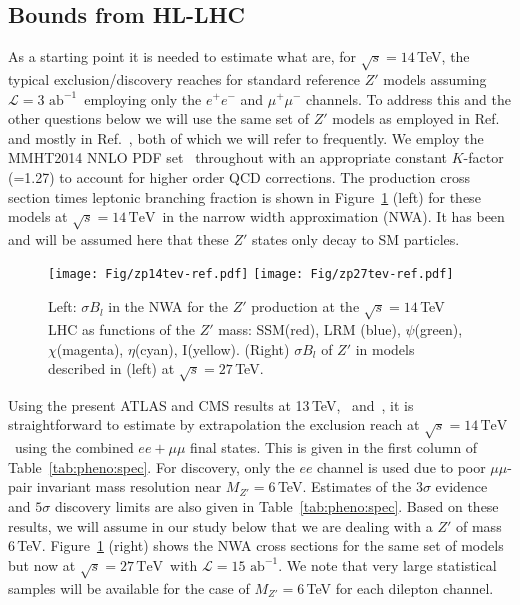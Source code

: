 \documentclass[a4paper,11pt]{article}
\newcommand*{\intlumihelhc}{\ensuremath{\mathcal{L}=15\,\text{ab}^{-1}}}
\newcommand*{\sqrtslhc}{\ensuremath{\sqrt{s}=14\,\text{TeV}}}
\newcommand*{\sqrtshelhc}{\ensuremath{\sqrt{s}=27\,\text{TeV}}}
\renewcommand*{\intlumihelhc}{\ensuremath{\mathcal{L}=15\text{ ab}^{-1}}}
\newcommand*{\intlumihllhc}{\ensuremath{\mathcal{L}=3\text{ ab}^{-1}}}
\begin{document}
\subsection{Bounds from HL-LHC}
As a starting point it is needed to estimate what are, for $\sqrt s=14$\,TeV, the typical exclusion/discovery reaches for standard reference $Z'$ models assuming \intlumihllhc\ employing only the $e^+e^-$ and $\mu^+\mu^-$ channels. To address this and the other questions below we will use the same set of $Z'$ models as employed
in Ref.~\cite{Rizzo:2014xma} and mostly in Ref.~\cite{Han:2013mra}, both of which we will refer to frequently. We employ the MMHT2014 NNLO PDF set~\cite{Harland-Lang:2014zoa}
throughout with an appropriate constant $K$-factor (=1.27) to account for higher order QCD corrections. The production cross section times leptonic branching fraction is shown in Figure~\ref{fig:pheno:toy} (left) for these models at \sqrtslhc\ in the narrow width approximation (NWA). It has been and will be assumed here that these $Z'$ states only decay to SM particles.


\begin{figure}[htbp]
  \centering
    \texttt{[image: Fig/zp14tev-ref.pdf]}
    \texttt{[image: Fig/zp27tev-ref.pdf]}
    \caption{Left: $\sigma B_l$ in the NWA for the $Z'$ production at the $\sqrt s=14$\,TeV LHC as functions of the $Z'$ mass: SSM(red), LRM (blue), $\psi$(green), $\chi$(magenta),
$\eta$(cyan), I(yellow). (Right) $\sigma B_l$ of $Z'$ in models described in (left) at $\sqrt s=27$\,TeV.}
\label{fig:pheno:toy}
\end{figure}

Using the present ATLAS and CMS results at 13\,TeV,~\cite{Aaboud:2017buh} and~\cite{Sirunyan:2018exx}, it is straightforward to estimate by extrapolation the
exclusion reach at \sqrtslhc\ using the combined $ee+\mu\mu$ final states. This is given in the first column of Table~\ref{tab:pheno:spec}. For discovery, only the $ee$ channel is used due to poor $\mu\mu$-pair invariant mass resolution near $M_{Z'}=6$\,TeV. Estimates of the $3\sigma$ evidence and $5\sigma$
discovery limits are also given in Table~\ref{tab:pheno:spec}. Based on these results, we will assume in our study below that we are dealing with a $Z'$ of mass 6\,TeV. Figure~\ref{fig:pheno:toy} (right) shows the NWA cross sections for the same set of models but now at \sqrtshelhc\ with \intlumihelhc. We note that very large statistical samples will be available for the case of $M_{Z'}=6$\,TeV
for each dilepton channel.
\end{document}
